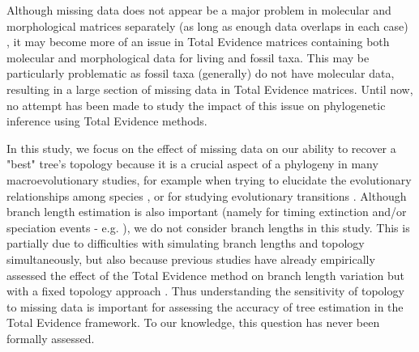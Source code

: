 \documentclass[12pt,letterpaper]{article}
\begin{document}
Although missing data does not appear be a major problem in molecular and morphological matrices separately (as long as enough data overlaps in each case) \citep{wiensmissing2003,wiensmissing2006,wiensmissing2008,rouresite-specific2011,pattinsonphylogeny2014}, it may become more of an issue in Total Evidence matrices containing both molecular and morphological data for living and fossil taxa. This may be particularly problematic as fossil taxa (generally) do not have molecular data, resulting in a large section of missing data in Total Evidence matrices. Until now, no attempt has been made to study the impact of this issue on phylogenetic inference using Total Evidence methods.

In this study, we focus on the effect of missing data on our ability to recover a "best" tree's topology because it is a crucial aspect of a phylogeny in many macroevolutionary studies, for example when trying to elucidate the evolutionary relationships among species \citep[e.g.][]{meredithimpacts2011,jetzthe2012}, or for studying evolutionary transitions \citep[e.g.][]{}. %
Although branch length estimation is also important (namely for timing extinction and/or speciation events - e.g. \citealt{ronquista2012}), we do not consider branch lengths in this study. This is partially due to difficulties with simulating branch lengths and topology simultaneously,
but also because previous studies have already empirically assessed the effect of the Total Evidence method on branch length variation but with a fixed topology approach \citep{ronquista2012,schragocombining2013,slaterphylogenetic2013,beckancient2014}.
Thus understanding the sensitivity of topology to missing data is important for assessing the accuracy of tree estimation in the Total Evidence framework. To our knowledge, this question has never been formally assessed.
\end{document}
